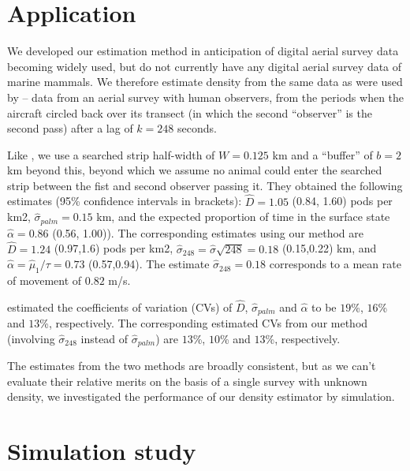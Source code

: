 \documentclass[useAMS, usenatbib, referee]{biom}\usepackage[]{graphicx}\usepackage[]{color}
\begin{document}
\section{Application \label{sec:applic}}

We  developed our estimation method in anticipation of digital aerial survey data becoming widely used, but do not currently have any digital aerial survey data of marine mammals. We therefore estimate density from the same data as were used by \cite{Stevenson+al:18} -- data from an aerial survey with human observers, from the periods when the aircraft circled back over its transect (in which the second ``observer'' is the second pass) after a lag of $k=248$ seconds. 



Like \cite{Stevenson+al:18}, we use a searched strip half-width of $W=0.125$ km and a ``buffer'' of $b=2$ km beyond this, beyond which we assume no animal could enter the searched strip between the fist and second observer passing it. They  obtained the following estimates (95\% confidence intervals in brackets): $\hat{D}=1.05$ (0.84, 1.60) pods per km2, $\hat{\sigma}_{palm}=0.15$ km, and the expected proportion of time in the surface state $\hat{\alpha}=0.86$ (0.56, 1.00)). The corresponding estimates using our method are $\hat{D}=1.24$ (0.97,1.6) pods per km2, $\hat{\sigma}_{248}=\hat{\sigma}\sqrt{248}=0.18$ (0.15,0.22) km, and $\hat{\alpha}=\hat{\mu}_1/\tau=0.73$ (0.57,0.94). The estimate $\hat{\sigma}_{248}=0.18$ corresponds to a mean rate of movement of $0.82$ m/s.

\cite{Stevenson+al:18} estimated the coefficients of variation (CVs) of $\hat{D}$, $\hat{\sigma}_{palm}$ and $\hat{\alpha}$ to be $19$\%, $16$\% and $13$\%, respectively. The corresponding estimated CVs from our method (involving $\hat{\sigma}_{248}$ instead of $\hat{\sigma}_{palm}$) are $13$\%, $10$\% and $13$\%, respectively.

The estimates from the two methods are broadly consistent, but as we can't evaluate their relative merits on the basis of a single survey with unknown density, we investigated the performance of our density estimator by simulation.


\section{Simulation study \label{sec:sim}}
\end{document}
